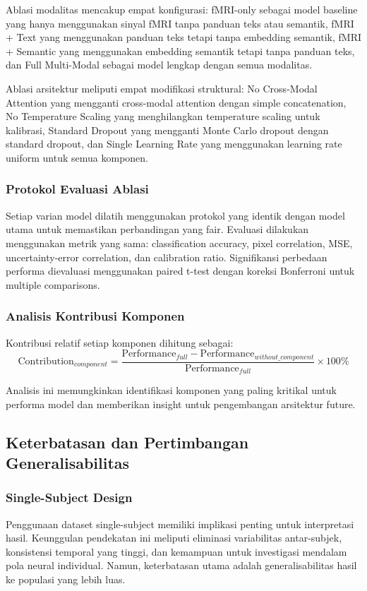 Ablasi modalitas mencakup empat konfigurasi: fMRI-only sebagai model baseline yang hanya menggunakan sinyal fMRI tanpa panduan teks atau semantik, fMRI + Text yang menggunakan panduan teks tetapi tanpa embedding semantik, fMRI + Semantic yang menggunakan embedding semantik tetapi tanpa panduan teks, dan Full Multi-Modal sebagai model lengkap dengan semua modalitas.

Ablasi arsitektur meliputi empat modifikasi struktural: No Cross-Modal Attention yang mengganti cross-modal attention dengan simple concatenation, No Temperature Scaling yang menghilangkan temperature scaling untuk kalibrasi, Standard Dropout yang mengganti Monte Carlo dropout dengan standard dropout, dan Single Learning Rate yang menggunakan learning rate uniform untuk semua komponen.

\subsubsection{Protokol Evaluasi Ablasi}
Setiap varian model dilatih menggunakan protokol yang identik dengan model utama untuk memastikan perbandingan yang fair. Evaluasi dilakukan menggunakan metrik yang sama: classification accuracy, pixel correlation, MSE, uncertainty-error correlation, dan calibration ratio. Signifikansi perbedaan performa dievaluasi menggunakan paired t-test dengan koreksi Bonferroni untuk multiple comparisons.

\subsubsection{Analisis Kontribusi Komponen}
Kontribusi relatif setiap komponen dihitung sebagai:
\begin{equation}
\text{Contribution}_{component} = \frac{\text{Performance}_{full} - \text{Performance}_{without\_component}}{\text{Performance}_{full}} \times 100\%
\label{eq:component_contribution}
\end{equation}

Analisis ini memungkinkan identifikasi komponen yang paling kritikal untuk performa model dan memberikan insight untuk pengembangan arsitektur future.

\subsection{Keterbatasan dan Pertimbangan Generalisabilitas}

\subsubsection{Single-Subject Design}
Penggunaan dataset single-subject memiliki implikasi penting untuk interpretasi hasil. Keunggulan pendekatan ini meliputi eliminasi variabilitas antar-subjek, konsistensi temporal yang tinggi, dan kemampuan untuk investigasi mendalam pola neural individual. Namun, keterbatasan utama adalah generalisabilitas hasil ke populasi yang lebih luas.


